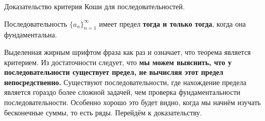 \newpage
\begin{problem}
Доказательство критерия Коши для последовательностей.
\end{problem}

\begin{theorem}
    Последовательность $\{a_n\}_{n=1}^{\infty}$
    имеет предел \textbf{тогда и только
        тогда}, когда она фундаментальна.
\end{theorem}
Выделенная жирным шрифтом фраза как
раз и означает, что теорема является
критерием. Из достаточности
следует, что \textbf{мы можем
    выяснить, что у последовательности
    существует предел, не вычисляя этот
    предел непосредственно.} Существуют
последовательности, где нахождение
предела является гораздо более
сложной задачей, чем проверка
фундаментальности последовательности.
Особенно хорошо это будет видно,
когда мы начнём изучать бесконечные
суммы, то есть ряды. Перейдём к доказательству.
